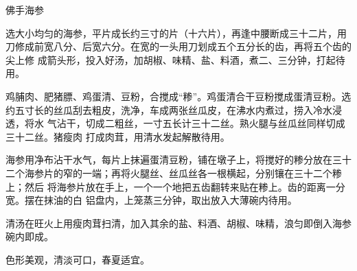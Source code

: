 \begin{recipe}{佛手海参}

\ingredients


\preparation

\step 选大小均匀的海参，平片成长约三寸的片（十六片），再逢中腰断成三十二片，用
刀修成前宽八分、后宽六分。在宽的一头用刀划成五个五分长的齿，再将五个齿的尖上修
成箭头形，投入好汤，加胡椒、味精、盐、料酒，煮二、三分钟，打起待用。

\step 鸡脯肉、肥猪膘、鸡蛋清、豆粉，合搅成“糁”。鸡蛋清合干豆粉搅成蛋清豆粉。选
约五寸长的丝瓜刮去粗皮，洗净，车成两张丝瓜皮，在沸水内煮过，捞入冷水浸透，将水
气沾干，切成二粗丝，一寸五长计三十二丝。熟火腿与丝瓜丝同样切成三十二丝。猪瘦肉
打成肉茸，用清水发起解散待用。

\step 海参用净布沾干水气，每片上抹遍蛋清豆粉，铺在墩子上，将搅好的糁分放在三十
二个海参片的窄的一端；再将火腿丝、丝瓜丝各一根横起，分别镶在三十二个糁上；然后
将海参片放在手上，一个一个地把五齿翻转来贴在糁上。齿的距离一分宽。摆在抹油的白
铝盘内，上笼蒸三分钟，取出放入大薄碗内待用。

\step 清汤在旺火上用瘦肉茸扫清，加入其余的盐、料酒、胡椒、味精，浪匀即倒入海参
碗内即成。

\features

色形美观，清淡可口，春夏适宜。

\end{recipe}


